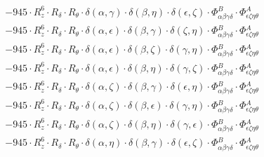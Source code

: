 \documentclass{article}
\begin{document}
\begin{equation}
\begin{array}{c}
 \\[0.2em] 		 - 945 \cdot R_{z}^{6} \cdot R_{\delta{}} \cdot R_{\theta{}} \cdot \delta{}\left(\alpha{}, \gamma{}\right) \cdot \delta{}\left(\beta{}, \eta{}\right) \cdot \delta{}\left(\epsilon{}, \zeta{}\right) \cdot \Phi{}^{B}_{\alpha{}\beta{}\gamma{}\delta{}} \cdot \Phi{}^{A}_{\epsilon{}\zeta{}\eta{}\theta{}} 
 \\[0.2em] 		 - 945 \cdot R_{z}^{6} \cdot R_{\delta{}} \cdot R_{\theta{}} \cdot \delta{}\left(\alpha{}, \epsilon{}\right) \cdot \delta{}\left(\beta{}, \gamma{}\right) \cdot \delta{}\left(\zeta{}, \eta{}\right) \cdot \Phi{}^{B}_{\alpha{}\beta{}\gamma{}\delta{}} \cdot \Phi{}^{A}_{\epsilon{}\zeta{}\eta{}\theta{}} 
 \\[0.2em] 		 - 945 \cdot R_{z}^{6} \cdot R_{\delta{}} \cdot R_{\theta{}} \cdot \delta{}\left(\alpha{}, \epsilon{}\right) \cdot \delta{}\left(\beta{}, \zeta{}\right) \cdot \delta{}\left(\gamma{}, \eta{}\right) \cdot \Phi{}^{B}_{\alpha{}\beta{}\gamma{}\delta{}} \cdot \Phi{}^{A}_{\epsilon{}\zeta{}\eta{}\theta{}} 
 \\[0.2em] 		 - 945 \cdot R_{z}^{6} \cdot R_{\delta{}} \cdot R_{\theta{}} \cdot \delta{}\left(\alpha{}, \epsilon{}\right) \cdot \delta{}\left(\beta{}, \eta{}\right) \cdot \delta{}\left(\gamma{}, \zeta{}\right) \cdot \Phi{}^{B}_{\alpha{}\beta{}\gamma{}\delta{}} \cdot \Phi{}^{A}_{\epsilon{}\zeta{}\eta{}\theta{}} 
 \\[0.2em] 		 - 945 \cdot R_{z}^{6} \cdot R_{\delta{}} \cdot R_{\theta{}} \cdot \delta{}\left(\alpha{}, \zeta{}\right) \cdot \delta{}\left(\beta{}, \gamma{}\right) \cdot \delta{}\left(\epsilon{}, \eta{}\right) \cdot \Phi{}^{B}_{\alpha{}\beta{}\gamma{}\delta{}} \cdot \Phi{}^{A}_{\epsilon{}\zeta{}\eta{}\theta{}} 
 \\[0.2em] 		 - 945 \cdot R_{z}^{6} \cdot R_{\delta{}} \cdot R_{\theta{}} \cdot \delta{}\left(\alpha{}, \zeta{}\right) \cdot \delta{}\left(\beta{}, \epsilon{}\right) \cdot \delta{}\left(\gamma{}, \eta{}\right) \cdot \Phi{}^{B}_{\alpha{}\beta{}\gamma{}\delta{}} \cdot \Phi{}^{A}_{\epsilon{}\zeta{}\eta{}\theta{}} 
 \\[0.2em] 		 - 945 \cdot R_{z}^{6} \cdot R_{\delta{}} \cdot R_{\theta{}} \cdot \delta{}\left(\alpha{}, \zeta{}\right) \cdot \delta{}\left(\beta{}, \eta{}\right) \cdot \delta{}\left(\gamma{}, \epsilon{}\right) \cdot \Phi{}^{B}_{\alpha{}\beta{}\gamma{}\delta{}} \cdot \Phi{}^{A}_{\epsilon{}\zeta{}\eta{}\theta{}} 
 \\[0.2em] 		 - 945 \cdot R_{z}^{6} \cdot R_{\delta{}} \cdot R_{\theta{}} \cdot \delta{}\left(\alpha{}, \eta{}\right) \cdot \delta{}\left(\beta{}, \gamma{}\right) \cdot \delta{}\left(\epsilon{}, \zeta{}\right) \cdot \Phi{}^{B}_{\alpha{}\beta{}\gamma{}\delta{}} \cdot \Phi{}^{A}_{\epsilon{}\zeta{}\eta{}\theta{}} 

\end{array}
\end{equation}
\end{document}
